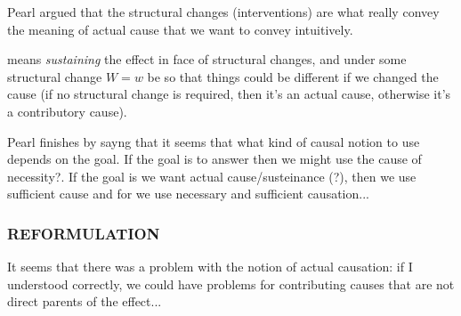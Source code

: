 Pearl argued that the structural changes (interventions) are what really convey the meaning of actual cause that we want to convey intuitively.

 means \textit{sustaining} the effect in face of structural changes, and under some structural change $W=w$ be so that things could be different if we changed the cause (if no structural change is required, then it's an actual cause, otherwise it's a contributory cause).

Pearl finishes by sayng that it seems that what kind of causal notion to use depends on the goal. If the goal is to answer  then we might use the cause of necessity?. If the goal is  we want actual cause/susteinance (?),  then we use sufficient cause and for  we use necessary and sufficient causation...

\subsubsection{REFORMULATION}

It seems that there was a problem with the notion of actual causation: if I understood correctly, we could have problems for contributing causes that are not direct parents of the effect...
